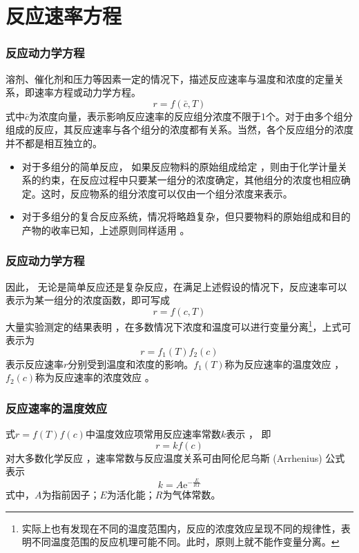 \section{反应速率方程}

\begin{frame}
    \frametitle{反应动力学方程}
    溶剂、催化剂和压力等因素一定的情况下，描述反应速率与温度和浓度的定量关系，即速率方程或动力学方程。
    \[
        r = f(\bar{c},T)
    \]
    式中$\bar{c}$为浓度向量，表示影响反应速率的反应组分浓度不限于1个。对于由多个组分组成的反应，其反应速率与各个组分的浓度都有关系。当然，各个反应组分的浓度并不都是相互独立的。
    \begin{itemize}
      \item 对于多组分的简单反应， 如果反应物料的原始组成给定 ，则由于化学计量关系的约束，在反应过程中只要某一组分的浓度确定，其他组分的浓度也相应确定。这时，反应物系的组分浓度可以仅由一个组分浓度来表示。 
      \item 对于多组分的复合反应系统，情况将略趋复杂，但只要物料的原始组成和目的产物的收率已知，上述原则同样适用 。
    \end{itemize}
\end{frame}


\begin{frame}
    \frametitle{反应动力学方程}
    因此， 无论是简单反应还是复杂反应，在满足上述假设的情况下，反应速率可以表示为某一组分的浓度函数，即可写成
    \[
        r = f(c,T)
    \]
    大量实验测定的结果表明 ，在多数情况下浓度和温度可以进行变量分离\footnote{实际上也有发现在不同的温度范围内，反应的浓度效应呈现不同的规律性，表明不同温度范围的反应机理可能不同。此时，原则上就不能作变量分离。}，上式可表示为
    \[
        r = f_1(T)f_2(c)
    \]
    表示反应速率$r$分别受到温度和浓度的影响。$f_1(T)$称为反应速率的温度效应 ，$f_2(c)$称为反应速率的浓度效应 。
\end{frame}


\begin{frame}
    \frametitle{反应速率的温度效应}
    式$r = f(T)f(c)$中温度效应项常用反应速率常数$k$表示 ， 即
    \[
        r = kf(c)
    \]
    对大多数化学反应 ，速率常数与反应温度关系可由阿伦尼乌斯 (Arrhenius) 公式表示
    \[
        k = A\mathrm{e}^{-\frac{E}{RT}}
    \]
    式中，$A$为指前因子；$E$为活化能；$R$为气体常数。
\end{frame}


